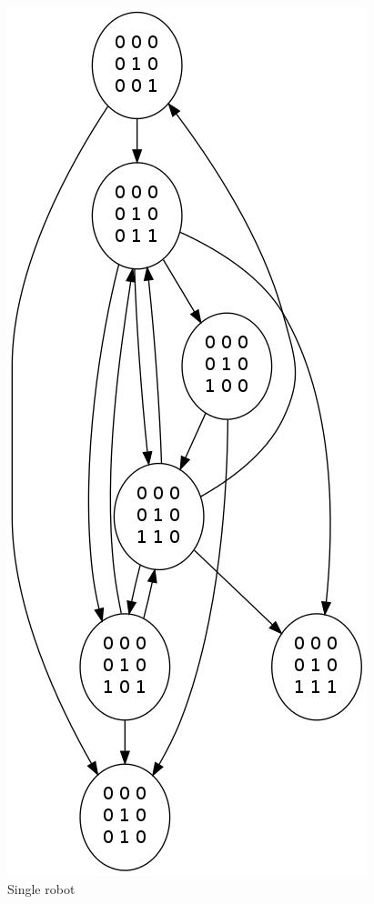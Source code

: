 \documentclass[11pt, a4paper]{article}
\theoremstyle{plain}
\theoremstyle{definition}
\theoremstyle{remark}
\begin{document}
\begin{figure}
\includegraphics[scale=0.50]{graph_single_all.jpg}
\caption{Single robot}
\label{graph:single}
\end{figure}
\end{document}
